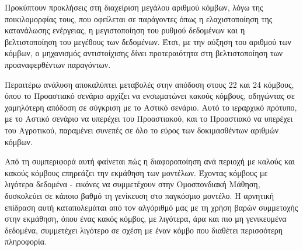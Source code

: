 Προκύπτουν προκλήσεις στη διαχείριση μεγάλου αριθμού κόμβων, λόγω της ποικιλομορφίας τους, που οφείλεται σε παράγοντες όπως η ελαχιστοποίηση της κατανάλωσης ενέργειας, η μεγιστοποίηση του ρυθμού δεδομένων και η βελτιστοποίηση του μεγέθους των δεδομένων. Έτσι, με την αύξηση του αριθμού των κόμβων, ο μηχανισμός αντιστοίχισης δίνει προτεραιότητα στη βελτιστοποίηση των προαναφερθέντων παραγόντων.

Περαιτέρω ανάλυση αποκαλύπτει μεταβολές στην απόδοση στους 22 και 24 κόμβους, όπου το Προαστιακό σενάριο αρχίζει να ενσωματώνει κακούς κόμβους, οδηγώντας σε χαμηλότερη απόδοση σε σύγκριση με το Αστικό σενάριο. Αυτό το ιεραρχικό πρότυπο, με το Αστικό σενάριο να υπερέχει του Προαστιακού, και το Προαστιακό να υπερέχει του Αγροτικού, παραμένει συνεπές σε όλο το εύρος των δοκιμασθέντων αριθμών κόμβων.

Από τη συμπεριφορά αυτή φαίνεται πώς η διαφοροποίηση ανά περιοχή με καλούς και κακούς κόμβους επηρεάζει την εκμάθηση των μοντέλων. Έχοντας κόμβους με λιγότερα δεδομένα - εικόνες να συμμετέχουν στην Ομοσπονδιακή Μάθηση, δυσκολεύει σε κάποιο βαθμό τη γενίκευση στο παγκόσμιο μοντέλο. Η αρνητική επίδραση αυτή καταπολεμάται από τον αλγόριθμό μας με τη χρήση βαρών συμμετοχής στην εκμάθηση, όπου ένας κακός κόμβος, με λιγότερα, άρα και πιο μη γενικευμένα δεδομένα, συμμετέχει λιγότερο σε σχέση με έναν κόμβο που διαθέτει περισσότερη πληροφορία.
